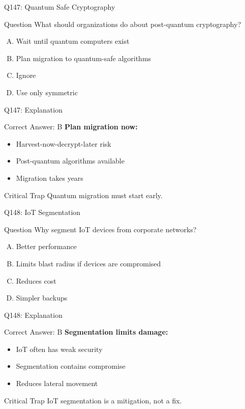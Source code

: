 \documentclass{beamer}
\begin{document}
	\begin{frame}{Q147: Quantum Safe Cryptography}
		\begin{block}{Question}
			What should organizations do about post-quantum cryptography?
		\end{block}
		\begin{enumerate}[(A)]
			\item Wait until quantum computers exist
			\item Plan migration to quantum-safe algorithms
			\item Ignore
			\item Use only symmetric
		\end{enumerate}
	\end{frame}
	
	\begin{frame}{Q147: Explanation}
		\begin{block}{Correct Answer: B}
			\textbf{Plan migration now:}
			\begin{itemize}
				\item Harvest-now-decrypt-later risk
				\item Post-quantum algorithms available
				\item Migration takes years
			\end{itemize}
		\end{block}
		\begin{alertblock}{Critical Trap}
			Quantum migration must start early.
		\end{alertblock}
	\end{frame}
	
	\begin{frame}{Q148: IoT Segmentation}
		\begin{block}{Question}
			Why segment IoT devices from corporate networks?
		\end{block}
		\begin{enumerate}[(A)]
			\item Better performance
			\item Limits blast radius if devices are compromised
			\item Reduces cost
			\item Simpler backups
		\end{enumerate}
	\end{frame}
	
	\begin{frame}{Q148: Explanation}
		\begin{block}{Correct Answer: B}
			\textbf{Segmentation limits damage:}
			\begin{itemize}
				\item IoT often has weak security
				\item Segmentation contains compromise
				\item Reduces lateral movement
			\end{itemize}
		\end{block}
		\begin{alertblock}{Critical Trap}
			IoT segmentation is a mitigation, not a fix.
		\end{alertblock}
	\end{frame}
	
\end{document}
